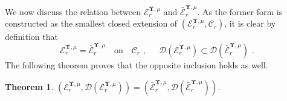 \documentclass[11pt,letterpaper]{amsart}
\newcommand{\dom}[1]{\mathcal D(#1)}
\newcommand{\R}{{\mathbb R}}
\newcommand{\comma}{\,\,\mathrm{,}\;\,}
\newcommand{\fstop}{\,\,\mathrm{.}}
\newcommand{\QP}{{\mu}}
\newcommand{\dUpsilon}{{\mathbf \Upsilon}}
\newcommand{\U}{\dUpsilon}
\newcommand{\E}{\mathcal E}
\renewcommand{\1}{\mathbf 1}
\numberwithin{equation}{section}
\theoremstyle{plain}
\newtheorem{thm}{Theorem}[section]
\newtheorem{lem}[thm]{Lemma}%
\theoremstyle{definition}
\theoremstyle{remark}
\begin{document}
We now discuss the relation between $\E_r^{\U, \QP}$ and $\bar{\E}_r^{\U, \QP}$. As the former form is constructed as the smallest closed extension of $(\E_r^{\U, \QP}, \mathcal C_r)$, it is clear by definition that 
$$\E_r^{\U, \QP}=\bar{\E}_r^{\U, \QP} \quad \text{on} \quad \mathcal C_r \comma \quad \dom{\E_r^{\U, \QP}} \subset \dom{\bar{\E}_r^{\U, \QP}} \fstop$$ 
The following theorem proves that the opposite inclusion holds as well. 
\begin{thm} \label{t:S=M}
$(\E_r^{\U, \QP}, \dom{\E_r^{\U, \QP}}) = (\bar{\E}_r^{\U, \QP}, \dom{\bar{\E}_r^{\U, \QP}})$. 
\end{thm}
\end{document}
